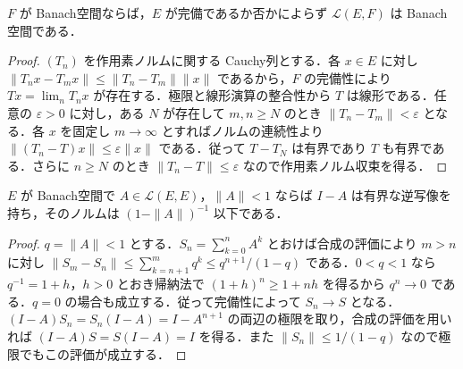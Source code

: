 \begin{prop}[有界線形作用素空間の完備性]
$F$ が Banach空間ならば，$E$ が完備であるか否かによらず $\mathcal L(E,F)$ は Banach空間である．
\end{prop}
\begin{proof}
$(T_n)$ を作用素ノルムに関する Cauchy列とする．各 $x\in E$ に対し $\|T_nx-T_mx\|\leq\|T_n-T_m\|\|x\|$ であるから，$F$ の完備性により $Tx=\lim_n T_nx$ が存在する．極限と線形演算の整合性から $T$ は線形である．任意の $\varepsilon>0$ に対し，ある $N$ が存在して $m,n\geq N$ のとき $\|T_n-T_m\|<\varepsilon$ となる．各 $x$ を固定し $m\to\infty$ とすればノルムの連続性より $\|(T_n-T)x\|\leq\varepsilon\|x\|$ である．従って $T-T_N$ は有界であり $T$ も有界である．さらに $n\geq N$ のとき $\|T_n-T\|\leq\varepsilon$ なので作用素ノルム収束を得る．
\end{proof}
\begin{prop}[作用素ノルムによる逆写像の存在]
$E$ が Banach空間で $A\in\mathcal L(E,E)$，$\|A\|<1$ ならば $I-A$ は有界な逆写像を持ち，そのノルムは $(1-\|A\|)^{-1}$ 以下である．
\end{prop}
\begin{proof}
$q=\|A\|<1$ とする．$S_n=\sum_{k=0}^n A^k$ とおけば合成の評価により $m>n$ に対し $\|S_m-S_n\|\leq\sum_{k=n+1}^m q^k\leq q^{n+1}/(1-q)$ である．$0<q<1$ なら $q^{-1}=1+h$，$h>0$ とおき帰納法で $(1+h)^n\geq1+nh$ を得るから $q^n\to0$ である．$q=0$ の場合も成立する．従って完備性によって $S_n\to S$ となる．$(I-A)S_n=S_n(I-A)=I-A^{n+1}$ の両辺の極限を取り，合成の評価を用いれば $(I-A)S=S(I-A)=I$ を得る．また $\|S_n\|\leq1/(1-q)$ なので極限でもこの評価が成立する．
\end{proof}
